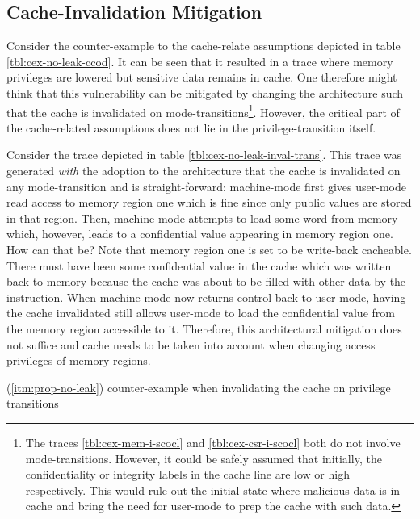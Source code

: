 \subsection{Cache-Invalidation Mitigation}
\label{sec:cache-inval-mit}

Consider the counter-example to the cache-relate assumptions  depicted in table \ref{tbl:cex-no-leak-ccod}.
It can be seen that it resulted in a trace where memory privileges are lowered but sensitive data remains in cache.
One therefore might think that this vulnerability can be mitigated by changing the architecture such that the cache is invalidated on mode-transitions\footnote{%
    The traces \ref{tbl:cex-mem-i-scocl} and \ref{tbl:cex-csr-i-scocl} both do not involve mode-transitions.
    However, it could be safely assumed that initially, the confidentiality or integrity labels in the cache line are low or high respectively.
    This would rule out the initial state where malicious data is in cache and bring the need for user-mode to prep the cache with such data.
}.
However, the critical part of the cache-related assumptions does not lie in the privilege-transition itself.

Consider the trace depicted in table \ref{tbl:cex-no-leak-inval-trans}.
This trace was generated \textit{with} the adoption to the architecture that the cache is invalidated on any mode-transition and is straight-forward:
machine-mode first gives user-mode read access to memory region one which is fine since only public values are stored in that region.
Then, machine-mode attempts to load some word from memory which, however, leads to a confidential value appearing in memory region one.
How can that be?
Note that memory region one is set to be write-back cacheable.
There must have been some confidential value in the cache which was written back to memory because the cache was about to be filled with other data by the  instruction.
When machine-mode now returns control back to user-mode, having the cache invalidated still allows user-mode to load the confidential value from the memory region accessible to it.
Therefore, this architectural mitigation does not suffice and cache needs to be taken into account when changing access privileges of memory regions.

\begin{table}
    \centering
    
    \caption{ (\ref{itm:prop-no-leak}) counter-example when invalidating the cache on privilege transitions}
    \label{tbl:cex-no-leak-inval-trans}
\end{table}

